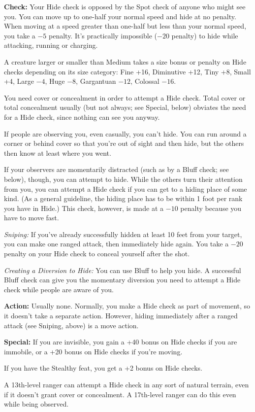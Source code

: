 \textbf{Check:} Your Hide check is opposed by the Spot check of anyone who might see you. You can move up to one-half your normal speed and hide at no penalty. When moving at a speed greater than one-half but less than your normal speed, you take a $-5$ penalty. It's practically impossible ($-20$ penalty) to hide while attacking, running or charging.

A creature larger or smaller than Medium takes a size bonus or penalty on Hide checks depending on its size category: Fine +16, Diminutive +12, Tiny +8, Small +4, Large $-4$, Huge $-8$, Gargantuan $-12$, Colossal $-16$.

You need cover or concealment in order to attempt a Hide check. Total cover or total concealment usually (but not always; see Special, below) obviates the need for a Hide check, since nothing can see you anyway.

If people are observing you, even casually, you can't hide. You can run around a corner or behind cover so that you're out of sight and then hide, but the others then know at least where you went.

If your observers are momentarily distracted (such as by a Bluff check; see below), though, you can attempt to hide. While the others turn their attention from you, you can attempt a Hide check if you can get to a hiding place of some kind. (As a general guideline, the hiding place has to be within 1 foot per rank you have in Hide.) This check, however, is made at a $-10$ penalty because you have to move fast.

\textit{Sniping:} If you've already successfully hidden at least 10 feet from your target, you can make one ranged attack, then immediately hide again. You take a $-20$ penalty on your Hide check to conceal yourself after the shot.

\textit{Creating a Diversion to Hide:} You can use Bluff to help you hide. A successful Bluff check can give you the momentary diversion you need to attempt a Hide check while people are aware of you.

\textbf{Action:} Usually none. Normally, you make a Hide check as part of movement, so it doesn't take a separate action. However, hiding immediately after a ranged attack (see Sniping, above) is a move action.

\textbf{Special:} If you are invisible, you gain a +40 bonus on Hide checks if you are immobile, or a +20 bonus on Hide checks if you're moving.

If you have the Stealthy feat, you get a +2 bonus on Hide checks.

A 13th-level ranger can attempt a Hide check in any sort of natural terrain, even if it doesn't grant cover or concealment. A 17th-level ranger can do this even while being observed.